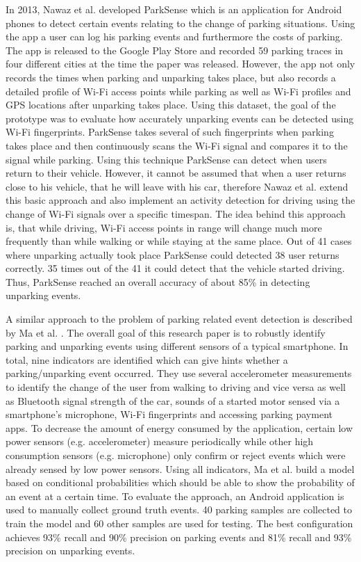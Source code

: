 In 2013, Nawaz et al. developed ParkSense \cite{Nawaz:2013:PSB:2500423.2500438} which is an application for Android phones to detect certain events relating to the change of parking situations. Using the app a user can log his parking events and furthermore the costs of parking. The app is released to the Google Play Store and recorded 59 parking traces in four different cities at the time the paper was released. However, the app not only records the times when parking and unparking takes place, but also records a detailed profile of Wi-Fi access points while parking as well as Wi-Fi profiles and GPS locations after unparking takes place. Using this dataset, the goal of the prototype was to evaluate how accurately unparking events can be detected using Wi-Fi fingerprints. ParkSense takes several of such fingerprints when parking takes place and then continuously scans the Wi-Fi signal and compares it to the signal while parking. Using this technique ParkSense can detect when users return to their vehicle. However, it cannot be assumed that when a user returns close to his vehicle, that he will leave with his car, therefore Nawaz et al. extend this basic approach and also implement an activity detection for driving using the change of Wi-Fi signals over a specific timespan. The idea behind this approach is, that while driving, Wi-Fi access points in range will change much more frequently than while walking or while staying at the same place. Out of 41 cases where unparking actually took place ParkSense could detected 38 user returns correctly. 35 times out of the 41 it could detect that the vehicle started driving. Thus, ParkSense reached an overall accuracy of about 85\% in detecting unparking events.

A similar approach to the problem of parking related event detection is described by Ma et al. \cite{Ma:2014:USP:2674918.2674929}. The overall goal of this research paper is to robustly identify parking and unparking events using different sensors of a typical smartphone. In total, nine indicators are identified which can give hints whether a parking/unparking event occurred. They use several accelerometer measurements to identify the change of the user from walking to driving and vice versa as well as Bluetooth signal strength of the car, sounds of a started motor sensed via a smartphone's microphone, Wi-Fi fingerprints and accessing parking payment apps. To decrease the amount of energy consumed by the application, certain low power sensors (e.g. accelerometer) measure periodically while other high consumption sensors (e.g. microphone) only confirm or reject events which were already sensed by low power sensors. Using all indicators, Ma et al. build a model based on conditional probabilities which should be able to show the probability of an event at a certain time. To evaluate the approach, an Android application is used to manually collect ground truth events. 40 parking samples are collected to train the model and 60 other samples are used for testing. The best configuration achieves 93\% recall and 90\% precision on parking events and 81\% recall and 93\% precision on unparking events.


